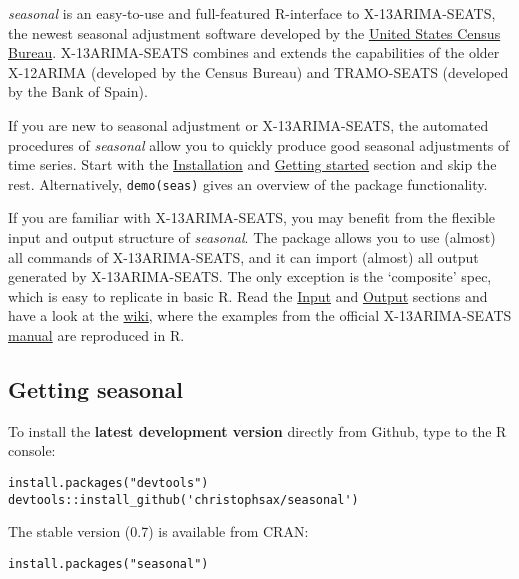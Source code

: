 \emph{seasonal} is an easy-to-use and full-featured R-interface to
X-13ARIMA-SEATS, the newest seasonal adjustment software developed by
the \href{http://www.census.gov/srd/www/x13as/}{United States Census
Bureau}. X-13ARIMA-SEATS combines and extends the capabilities of the
older X-12ARIMA (developed by the Census Bureau) and TRAMO-SEATS
(developed by the Bank of Spain).

If you are new to seasonal adjustment or X-13ARIMA-SEATS, the automated
procedures of \emph{seasonal} allow you to quickly produce good seasonal
adjustments of time series. Start with the
\hyperref[installation]{Installation} and
\hyperref[getting-started]{Getting started} section and skip the rest.
Alternatively, \texttt{demo(seas)} gives an overview of the package
functionality.

If you are familiar with X-13ARIMA-SEATS, you may benefit from the
flexible input and output structure of \emph{seasonal}. The package
allows you to use (almost) all commands of X-13ARIMA-SEATS, and it can
import (almost) all output generated by X-13ARIMA-SEATS. The only
exception is the `composite' spec, which is easy to replicate in basic
R. Read the \hyperref[input]{Input} and \hyperref[output]{Output}
sections and have a look at the
\href{https://github.com/christophsax/seasonal/wiki/Examples-of-X-13ARIMA-SEATS-in-R}{wiki},
where the examples from the official X-13ARIMA-SEATS
\href{http://www.census.gov/ts/x13as/docX13ASHTML.pdf}{manual} are
reproduced in R.


\subsection{Getting seasonal}\label{getting-seasonal}

To install the \textbf{latest development version} directly from Github,
type to the R console:

\begin{verbatim}
install.packages("devtools")
devtools::install_github('christophsax/seasonal')
\end{verbatim}

The stable version (0.7) is available from CRAN:

\begin{verbatim}
install.packages("seasonal")
\end{verbatim}

